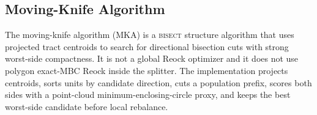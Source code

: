 \subsection{Moving-Knife Algorithm}

The moving-knife algorithm (MKA) is a \textsc{bisect} structure algorithm that
uses projected tract centroids to search for directional bisection cuts with
strong worst-side compactness.  It is not a global Reock optimizer and it does
not use polygon exact-MBC Reock inside the splitter.  The implementation projects
centroids, sorts units by candidate direction, cuts a population prefix, scores
both sides with a point-cloud minimum-enclosing-circle proxy, and keeps the best
worst-side candidate before local rebalance.

